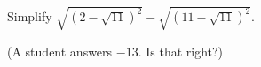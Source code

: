 Simplify $\sqrt{\left(2-\sqrt{11}\right)^2}-\sqrt{\left(11-\sqrt{11}\right)^2}$.

(A student answers $-13$. Is that right?)
